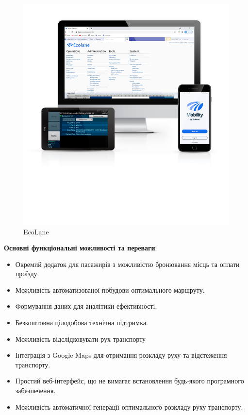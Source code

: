 \documentclass[14pt]{extreport}
\begin{document}
\begin{normalsize}
	\begin{figure}[H]
		\centering
		\includegraphics[trim={0 8cm 0 2cm},clip,scale=0.7]{1}
		\caption{EcoLane}
	\end{figure}
	
	\textbf{Основні функціональні можливості та переваги}:
	\begin{itemize}
		\item Окремий додаток для пасажирів з можливістю бронювання місць та оплати проїзду.
		\item Можливість автоматизованої побудови оптимального маршруту.
		\item Формування даних для аналітики ефективності.
		\item Безкоштовна цілодобова технічна підтримка.
		\item Можливість відслідковувати рух транспорту
		\item Інтеграція з Google Maps для отримання розкладу руху та відстеження транспорту.
		\item Простий веб-інтерфейс, що не вимагає встановлення будь-якого програмного забезпечення.
		\item Можливість автоматичної генерації оптимального розкладу руху транспорту.
	\end{itemize}
	

\end{normalsize}
\end{document}
